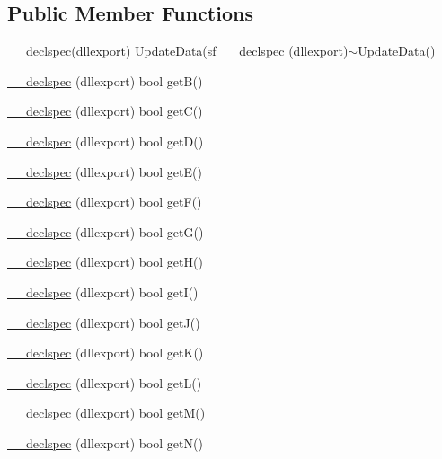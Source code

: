 \subsection*{Public Member Functions}
\begin{DoxyCompactItemize}
\item 
\-\_\-\-\_\-declspec(dllexport) \hyperlink{class_update_data}{Update\-Data}(sf \hyperlink{class_update_data_a5c8ec8244a43c31e16d47e3fcc430a62}{\-\_\-\-\_\-declspec} (dllexport)$\sim$\hyperlink{class_update_data}{Update\-Data}()
\item 
\hyperlink{class_update_data_a901c4bca51ebf8d6b6a5dc204c633f13}{\-\_\-\-\_\-declspec} (dllexport) bool get\-B()
\item 
\hyperlink{class_update_data_a078f6ca42e6e67eddd51d47f6af5f699}{\-\_\-\-\_\-declspec} (dllexport) bool get\-C()
\item 
\hyperlink{class_update_data_a59723459919fec4441ec32a762b8af98}{\-\_\-\-\_\-declspec} (dllexport) bool get\-D()
\item 
\hyperlink{class_update_data_a53f75bc353ff5584c8f14f39dccf9f72}{\-\_\-\-\_\-declspec} (dllexport) bool get\-E()
\item 
\hyperlink{class_update_data_ac9e3bcca2ced1aa3444aede07f5087dd}{\-\_\-\-\_\-declspec} (dllexport) bool get\-F()
\item 
\hyperlink{class_update_data_aeb7b3d5c84652ced23ef1fa34d577e9b}{\-\_\-\-\_\-declspec} (dllexport) bool get\-G()
\item 
\hyperlink{class_update_data_a2a1a9b6ebed9b5da2d5800ffddd10fd4}{\-\_\-\-\_\-declspec} (dllexport) bool get\-H()
\item 
\hyperlink{class_update_data_a43b3bcdfa8ad6c4d51e4370b7a65eeca}{\-\_\-\-\_\-declspec} (dllexport) bool get\-I()
\item 
\hyperlink{class_update_data_ace7830b5035e5c75bb1f5d2d44b5ee60}{\-\_\-\-\_\-declspec} (dllexport) bool get\-J()
\item 
\hyperlink{class_update_data_a1516c02669d8a513aee28db77febb8e8}{\-\_\-\-\_\-declspec} (dllexport) bool get\-K()
\item 
\hyperlink{class_update_data_a5ab6f9ee2c95703cff5feeca242d5072}{\-\_\-\-\_\-declspec} (dllexport) bool get\-L()
\item 
\hyperlink{class_update_data_a289bdde81f0347fbbaf4fa73fd343451}{\-\_\-\-\_\-declspec} (dllexport) bool get\-M()
\item 
\hyperlink{class_update_data_a459b19cfc37bc7c6fe6f419ffb4814af}{\-\_\-\-\_\-declspec} (dllexport) bool get\-N()

\end{DoxyCompactItemize}
